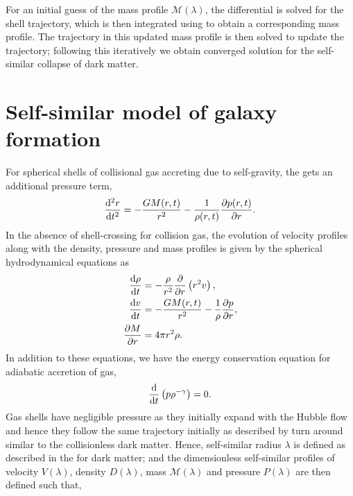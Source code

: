 For an initial guess of the mass profile $\mathcal{M}(\lambda)$, the differential  is solved for the shell trajectory, which is then integrated using  to obtain a corresponding mass profile. The trajectory in this updated mass profile is then solved to update the trajectory; following this iteratively we obtain converged solution for the self-similar collapse of dark matter.


\section{Self-similar model of galaxy formation}
\label{sec:methods-gas-ch:ssr}
For spherical shells of collisional gas accreting due to self-gravity, the  gets an additional pressure term,
\begin{align}
\label{eq:gas_traj_phys_accl-ch:ssr}
\frac{{\rm d}^2 r}{{\rm d} t^2} = - \frac{GM(r,t)}{r^2} -\frac{1}{\rho(r,t) }\frac{\partial p(r,t)}{\partial r}.
\end{align}
In the absence of shell-crossing for collision gas, the evolution of velocity profiles along with the density, pressure and mass profiles is given by the spherical hydrodynamical equations \cite{1985Bertschinger} as
\begin{align}
\label{eq:sph_hydro_cont-ch:ssr}
\frac{{\rm d}\rho }{{\rm d}t} &= -\frac{\rho }{r^2}\frac{\mathrm{\partial} }{\mathrm{\partial} r} \left( r^2v \right) , \\
\label{eq:sph_hydro_accl-ch:ssr}
\frac{{\rm d}v}{{\rm d}t} &= - \frac{GM(r,t)}{r^2} -\frac{1}{\rho }\frac{\partial p}{\mathrm{\partial} r}, \\
\label{eq:sph_hydro_mass_cons-ch:ssr}
\frac{\mathrm{\partial} M}{\mathrm{\partial} r} &= 4\pi r^2 \rho.
\end{align}
In addition to these equations, we have the energy conservation equation for adiabatic accretion of gas, 
\begin{align}
\label{eq:sph_hydro_adiab-ch:ssr}
\frac{{\rm d}}{{\rm d}t}\left( p \rho ^{-\gamma } \right) = 0.
\end{align}
Gas shells have negligible pressure as they initially expand with the Hubble flow and hence they follow the same trajectory initially as described by  turn around similar to the collisionless dark matter. Hence, self-similar radius $\lambda$ is defined as described in the  for dark matter; and the dimensionless self-similar profiles of velocity $V(\lambda)$, density $D(\lambda)$, mass $\mathcal{M}(\lambda)$ and pressure $P(\lambda)$ are then defined such that,
